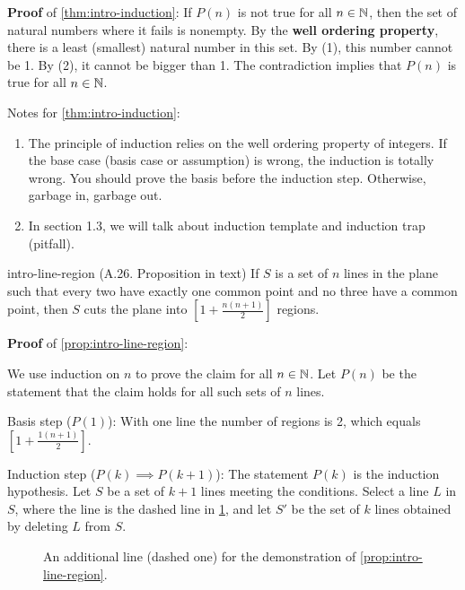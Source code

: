 \documentclass[../src/handouts/main.tex]{subfiles}
\begin{document}
\textbf{Proof} of \cref{thm:intro-induction}:
If $P(n)$ is not true for all $n \in \mathbb{N}$, then the set of natural numbers where it fails is nonempty.
By the \textbf{well ordering property}, there is a least (smallest) natural number in this set.
By (1), this number cannot be 1.
By (2), it cannot be bigger than 1.
The contradiction implies that $P(n)$ is true for all $n \in \mathbb{N}$.

Notes for \cref{thm:intro-induction}:
\begin{enumerate}
  \item The principle of induction relies on the well ordering property of integers. If the base case (basis case or assumption) is wrong, the induction is totally wrong. You should prove the basis before the induction step. Otherwise, garbage in, garbage out.
  \item In section 1.3, we will talk about induction template and induction trap (pitfall). %
\end{enumerate}

\begin{proposition}{}{intro-line-region}
  (A.26. Proposition in text)
  If $S$ is a set of $n$ lines in the plane such that every two have exactly one common point and no three have a common point, then $S$ cuts the plane into $\left[ 1 + \frac{n (n + 1)}{2} \right]$ regions.
\end{proposition}

\textbf{Proof} of \cref{prop:intro-line-region}:

We use induction on $n$ to prove the claim for all $n \in \mathbb{N}$.
Let $P(n)$ be the statement that the claim holds for all such sets of $n$ lines.

Basis step ($P(1)$): With one line the number of regions is 2, which equals $\left[ 1 + \frac{1 (n + 1)}{2} \right]$.

Induction step ($P(k) \implies P(k + 1)$): The statement $P(k)$ is the induction hypothesis. Let $S$ be a set of $k + 1$ lines meeting the conditions. Select a line $L$ in $S$, where the line is the dashed line in \cref{fig:intro-line-region-additional}, and let $S'$ be the set of $k$ lines obtained by deleting $L$ from $S$.

\begin{figure}
  \centering
  \caption{An additional line (dashed one) for the demonstration of \cref{prop:intro-line-region}.}
  \label{fig:intro-line-region-additional}
\end{figure}
\end{document}
